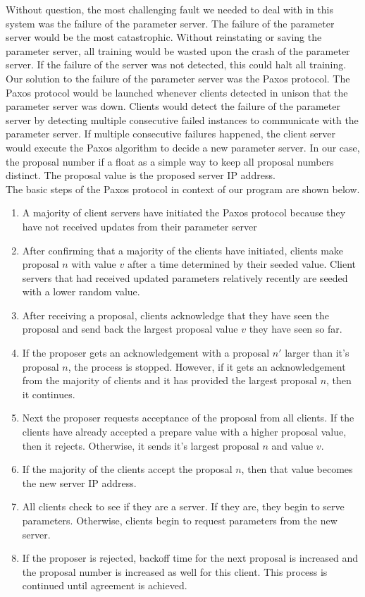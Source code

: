 \documentclass[11pt]{article}
\begin{document}
\noindent Without question, the most challenging fault we needed to deal with in this system was the failure of the parameter server. The failure of the parameter server would be the most catastrophic. Without reinstating or saving the parameter server, all training would be wasted upon the crash of the parameter server. If the failure of the server was not detected, this could halt all training. \\ 

\noindent Our solution to the failure of the parameter server was the Paxos protocol. The Paxos protocol would be launched whenever clients detected in unison that the parameter server was down. Clients would detect the failure of the parameter server by detecting multiple consecutive failed instances to communicate with the parameter server. If multiple consecutive failures happened, the client server would execute the Paxos algorithm to decide a new parameter server. In our case, the proposal number if a float as a simple way to keep all proposal numbers distinct. The proposal value is the proposed server IP address. \\

\noindent The basic steps of the Paxos protocol in context of our program are shown below.
\begin{enumerate}
    \item A majority of client servers have initiated the Paxos protocol because they have not received updates from their parameter server
    \item After confirming that a majority of the clients have initiated, clients make proposal $n$ with value $v$ after a time determined by their seeded value. Client servers that had received updated parameters relatively recently are seeded with a lower random value.
    \item After receiving a proposal, clients acknowledge that they have seen the proposal and send back the largest proposal value $v$ they have seen so far.
    \item If the proposer gets an acknowledgement with a proposal $n'$ larger than it's proposal $n$, the process is stopped. However, if it gets an acknowledgement from the majority of clients and it has provided the largest proposal $n$, then it continues. 
    \item Next the proposer requests acceptance of the proposal from all clients. If the clients have already accepted a prepare value with a higher proposal value, then it rejects. Otherwise, it sends it's largest proposal  $n$ and value $v$.
    \item If the majority of the clients accept the proposal $n$, then that value becomes the new server IP address.
    \item All clients check to see if they are a server. If they are, they begin to serve parameters. Otherwise, clients begin to request parameters from the new server.
    \item If the proposer is rejected, backoff time for the next proposal is increased and the proposal number is increased as well for this client. This process is continued until agreement is achieved.
\end{enumerate}
\end{document}
